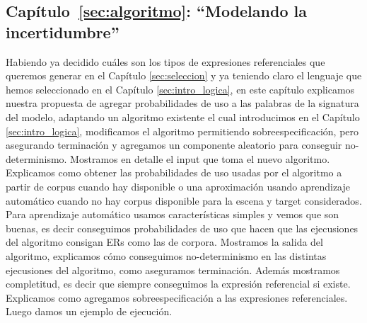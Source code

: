 \subsection{Cap\'itulo~\ref{sec:algoritmo}: ``Modelando la incertidumbre''} 
Habiendo ya decidido cu\'ales son los tipos de expresiones referenciales que queremos generar en el Cap\'itulo \ref{sec:seleccion} y ya teniendo
claro el lenguaje \EL que hemos seleccionado en el Cap\'itulo \ref{sec:intro_logica}, en este cap\'itulo 
explicamos nuestra propuesta de agregar probabilidades de uso a las palabras de la signatura del modelo, adaptando un algoritmo existente 
\cite{areces08} el cual introducimos en el Cap\'itulo \ref{sec:intro_logica}, modificamos el algoritmo permitiendo sobreespecificaci\'on, 
pero asegurando terminaci\'on y agregamos un componente aleatorio para conseguir no-determinismo. Mostramos en detalle el input que toma el
 nuevo algoritmo. Explicamos como obtener las probabilidades de uso usadas por el algoritmo a partir de corpus cuando hay disponible o una aproximaci\'on usando aprendizaje autom\'atico cuando no hay corpus disponible para la escena y target considerados. Para aprendizaje autom\'atico usamos caracter\'isticas simples y vemos que son buenas, es decir conseguimos probabilidades de uso que hacen que las ejecusiones del algoritmo consigan ERs como las de corpora. 
Mostramos la salida del algoritmo, explicamos c\'omo conseguimos no-determinismo en las distintas ejecusiones del algoritmo, como aseguramos 
terminaci\'on. Adem\'as mostramos completitud, es decir que siempre conseguimos la expresi\'on referencial si existe. Explicamos como agregamos sobreespecificaci\'on a las expresiones referenciales. Luego damos un ejemplo de ejecuci\'on. 



